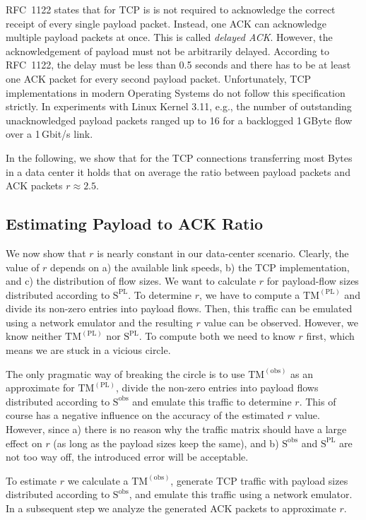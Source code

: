 \documentclass[journal,10pt]{IEEEtran}
\newcommand{\obstm}{\ensuremath{\mathrm{TM}^{(\mathrm{obs})}}}
\newcommand{\pltm}{\ensuremath{\mathrm{TM}^{(\mathrm{PL})}}}
\newcommand{\size}[1]{\ensuremath{\mathrm{S}  ^{\mathrm{#1}}}}
\begin{document}
	
	RFC~1122 \cite{rfc1122} states that for TCP is is not required to acknowledge the correct receipt of every single payload packet. 
	Instead, one ACK can acknowledge multiple payload packets at once.
	This is called \emph{delayed ACK}. However, the acknowledgement of payload must not be arbitrarily delayed.
	According to RFC~1122, the delay must be less than 0.5 seconds and 
	there has to be at least one ACK packet for every second payload packet.
Unfortunately, TCP implementations in modern Operating Systems do not follow this specification strictly.
	In experiments with Linux Kernel 3.11, e.g., the number of outstanding unacknowledged payload packets ranged up to 16 for a
	backlogged 1\,GByte flow over a 1\,Gbit/s link.
	
	In the following, we show that for the TCP connections transferring most Bytes in a data center it holds that on average 
	the ratio between payload packets and ACK packets $r \approx 2.5$.
	


\subsection{Estimating Payload to ACK Ratio}
\label{sec:payloadtoackratio}

	We now show that $r$ is nearly constant in our data-center scenario.
	Clearly, the value of $r$ depends on a) the available link speeds, b) the TCP implementation, and c) the distribution of flow sizes.
	We want to calculate $r$ for payload-flow sizes distributed according to \size{PL}.
	To determine $r$, we have to compute a \pltm{} and divide its non-zero entries into payload flows. 
	Then, this traffic can be emulated using a network emulator and
	the resulting $r$ value can be observed. However, we know neither \pltm{} nor \size{PL}. 
	To compute both we need to know $r$ first, which means we are stuck in a vicious circle.
	
	The only pragmatic way of breaking the circle is to use \obstm{} as an approximate for \pltm{},
	divide the non-zero entries into payload flows distributed according to \size{obs} and emulate this traffic to determine $r$.
	This of course has a negative influence on the accuracy of the estimated $r$ value.
	However, since a) there is no reason why the traffic matrix should have a large effect on $r$ (as long as the payload sizes keep the same),
	and b) \size{obs} and \size{PL} are not too way off, the introduced error will be acceptable.

	To estimate $r$ we calculate a \obstm{}, 
	generate TCP traffic with payload sizes distributed according to \size{obs},
	and emulate this traffic using a network emulator.
	In a subsequent step we analyze the generated ACK packets to approximate $r$.
	
\end{document}
